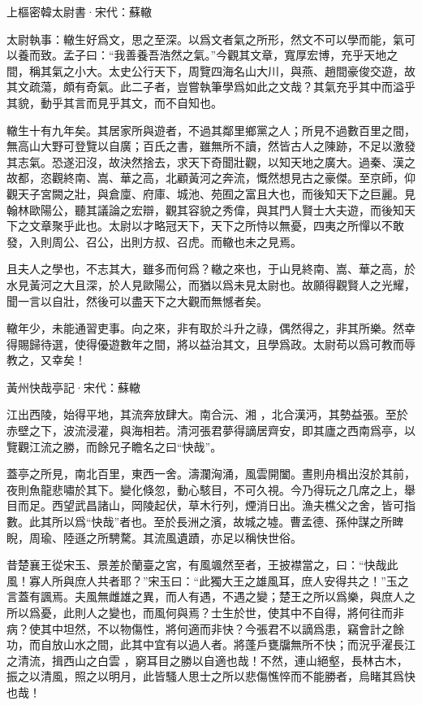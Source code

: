 \documentclass[12pt,a4paper]{ctexbook}
\begin{document}
上樞密韓太尉書·宋代：蘇轍 \par
太尉執事：轍生好爲文，思之至深。以爲文者氣之所形，然文不可以學而能，氣可以養而致。孟子曰：“我善養吾浩然之氣。”今觀其文章，寬厚宏博，充乎天地之間，稱其氣之小大。太史公行天下，周覽四海名山大川，與燕、趙間豪俊交遊，故其文疏蕩，頗有奇氣。此二子者，豈嘗執筆學爲如此之文哉？其氣充乎其中而溢乎其貌，動乎其言而見乎其文，而不自知也。\par
轍生十有九年矣。其居家所與遊者，不過其鄰里鄉黨之人；所見不過數百里之間，無高山大野可登覽以自廣；百氏之書，雖無所不讀，然皆古人之陳跡，不足以激發其志氣。恐遂汩沒，故決然捨去，求天下奇聞壯觀，以知天地之廣大。過秦、漢之故都，恣觀終南、嵩、華之高，北顧黃河之奔流，慨然想見古之豪傑。至京師，仰觀天子宮闕之壯，與倉廩、府庫、城池、苑囿之富且大也，而後知天下之巨麗。見翰林歐陽公，聽其議論之宏辯，觀其容貌之秀偉，與其門人賢士大夫遊，而後知天下之文章聚乎此也。太尉以才略冠天下，天下之所恃以無憂，四夷之所憚以不敢發，入則周公、召公，出則方叔、召虎。而轍也未之見焉。\par
且夫人之學也，不志其大，雖多而何爲？轍之來也，于山見終南、嵩、華之高，於水見黃河之大且深，於人見歐陽公，而猶以爲未見太尉也。故願得觀賢人之光耀，聞一言以自壯，然後可以盡天下之大觀而無憾者矣。\par
轍年少，未能通習吏事。向之來，非有取於斗升之祿，偶然得之，非其所樂。然幸得賜歸待選，使得優遊數年之間，將以益治其文，且學爲政。太尉苟以爲可教而辱教之，又幸矣！\par
黃州快哉亭記·宋代：蘇轍 \par
江出西陵，始得平地，其流奔放肆大。南合沅、湘 ，北合漢沔，其勢益張。至於赤壁之下，波流浸灌，與海相若。清河張君夢得謫居齊安，即其廬之西南爲亭，以覽觀江流之勝，而餘兄子瞻名之曰“快哉”。\par
蓋亭之所見，南北百里，東西一舍。濤瀾洶涌，風雲開闔。晝則舟楫出沒於其前，夜則魚龍悲嘯於其下。變化倏忽，動心駭目，不可久視。今乃得玩之几席之上，舉目而足。西望武昌諸山，岡陵起伏，草木行列，煙消日出。漁夫樵父之舍，皆可指數。此其所以爲“快哉”者也。至於長洲之濱，故城之墟。曹孟德、孫仲謀之所睥睨，周瑜、陸遜之所騁騖。其流風遺蹟，亦足以稱快世俗。\par
昔楚襄王從宋玉、景差於蘭臺之宮，有風颯然至者，王披襟當之，曰：“快哉此風！寡人所與庶人共者耶？”宋玉曰：“此獨大王之雄風耳，庶人安得共之！”玉之言蓋有諷焉。夫風無雌雄之異，而人有遇，不遇之變；楚王之所以爲樂，與庶人之所以爲憂，此則人之變也，而風何與焉？士生於世，使其中不自得，將何往而非病？使其中坦然，不以物傷性，將何適而非快？今張君不以謫爲患，竊會計之餘功，而自放山水之間，此其中宜有以過人者。將蓬戶甕牖無所不快；而況乎濯長江之清流，揖西山之白雲 ，窮耳目之勝以自適也哉！不然，連山絕壑，長林古木，振之以清風，照之以明月，此皆騷人思士之所以悲傷憔悴而不能勝者，烏睹其爲快也哉！\par
\end{document}
